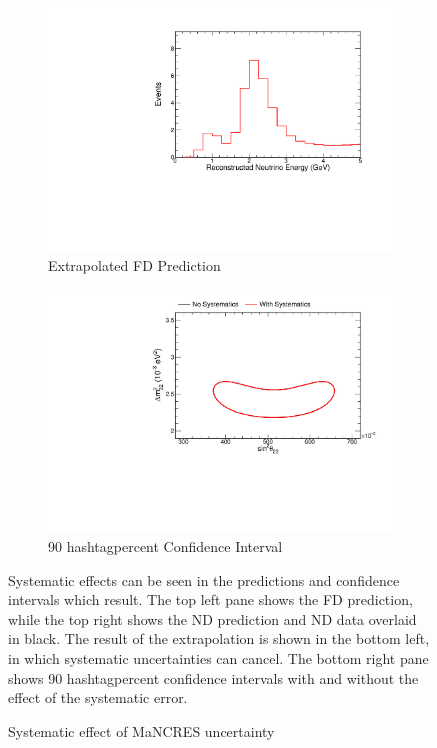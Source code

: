 {\begin{figure}
\begin{center}
\begin{subfigure}[c]{0.49\textwidth}
\includegraphics[width=\textwidth]{figures/systs/prediction/fd_extrap_prediction_MaNCRES.pdf}
\caption*{Extrapolated FD Prediction}
\end{subfigure}
\begin{subfigure}[c]{0.49\textwidth}
\includegraphics[width=\textwidth]{figures/systs/prediction/fd_extrap_contour_MaNCRES.pdf}
\caption*{90 hashtagpercent Confidence Interval}
\end{subfigure}
\end{center}
\caption{Systematic effect of MaNCRES uncertainty}{
Systematic effects can be seen in the predictions and confidence intervals
which result.
The top left pane shows the FD prediction, while the top right shows the
ND prediction and ND data overlaid in black.
The result of the extrapolation is shown in the bottom left, in which
systematic uncertainties can cancel.
The bottom right pane shows 90 hashtagpercent confidence intervals with and without
the effect of the systematic error.}
\label{syst_fig_MaNCRES}


\end{figure}}
